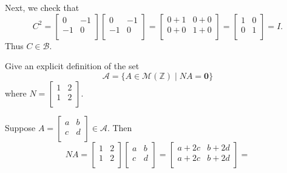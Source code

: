 \begin{exam}
\begin{apart}
\begin{soln}
                Next, we check that $$C^2=
                \left[ \begin{array}{cc} 0 & -1 \\ -1 & 0\\ \end{array} \right]
                \left[ \begin{array}{cc} 0 & -1 \\ -1 & 0\\ \end{array} \right] = 
                \left[ \begin{array}{cc} 0+1 & 0+0 \\ 0+0 & 1+0\\ \end{array} \right] = 
                \left[ \begin{array}{cc} 1 & 0 \\ 0 & 1\\ \end{array} \right] = I.$$
                Thus $C \in \mathscr{B}$.
            \end{soln}
        \item Give an explicit definition of the set $$\mathscr{A}= \{ A \in \mathscr{M}(\mathbb{Z}) \mid NA = \mathbf{0}\}$$
        where $N = \left[ \begin{array}{cc} 1 & 2 \\ 1 & 2\\ \end{array} \right]$.
            \begin{soln}
                Suppose $A = \left[ \begin{array}{cc} a & b \\ c & d\\ \end{array} \right] \in \mathscr{A}$.  Then $$NA = 
                \left[ \begin{array}{cc} 1 & 2 \\ 1 & 2\\ \end{array} \right]
                \left[ \begin{array}{cc} a & b \\ c & d\\ \end{array} \right] = 
                \left[ \begin{array}{cc} a+2c & b+2d \\ a+2c & b+2d\\ \end{array} \right] = 
$$
\end{soln}
\end{apart}
\end{exam}
